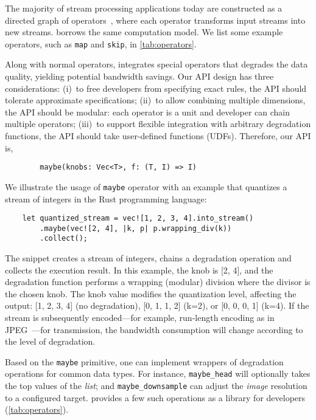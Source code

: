 The majority of stream processing applications today are constructed as a
directed graph of operators~\cite{toshniwal2014storm, zaharia2013discretized},
where each operator transforms input streams into new streams. \sysname{}
borrows the same computation model. We list some example operators, such as
\texttt{map} and \texttt{skip}, in \autoref{tab:operators}.

Along with normal operators, \sysname{} integrates special \maybe{} operators
that degrades the data quality, yielding potential bandwidth savings. Our API
design has three considerations: (i)~to free developers from specifying exact
rules, the API should tolerate approximate specifications; (ii)~to allow
combining multiple dimensions, the API should be modular: each operator is a
unit and developer can chain multiple operators; (iii)~to support flexible
integration with arbitrary degradation functions, the API should take
user-defined functions (UDFs). Therefore, our API is,

\vspace{-2pt}
\begin{lstlisting}
        maybe(knobs: Vec<T>, f: (T, I) => I)
\end{lstlisting}

We illustrate the usage of \texttt{maybe} operator with an example that
quantizes a stream of integers in the Rust programming language:

\vspace{-2pt}
\begin{lstlisting}
    let quantized_stream = vec![1, 2, 3, 4].into_stream()
        .maybe(vec![2, 4], |k, p| p.wrapping_div(k))
        .collect();
\end{lstlisting}

The snippet creates a stream of integers, chains a degradation operation and
collects the execution result. In this example, the knob is [2, 4], and the
degradation function performs a wrapping (modular) division where the divisor is
the chosen knob. The knob value modifies the quantization level, affecting the
output: [1, 2, 3, 4] (no degradation), [0, 1, 1, 2] (k=2), or [0, 0, 0, 1]
(k=4). If the stream is subsequently encoded---for example, run-length encoding
as in JPEG~\cite{wallace1992jpeg}---for transmission, the bandwidth consumption
will change according to the level of degradation.

Based on the \texttt{maybe} primitive, one can implement wrappers of degradation
operations for common data types. For instance, \texttt{maybe\_head} will
optionally takes the top values of the \textit{list}; and
\texttt{maybe\_downsample} can adjust the \textit{image} resolution to a
configured target. \sysname{} provides a few such operations as a library for
developers (\autoref{tab:operators}).

